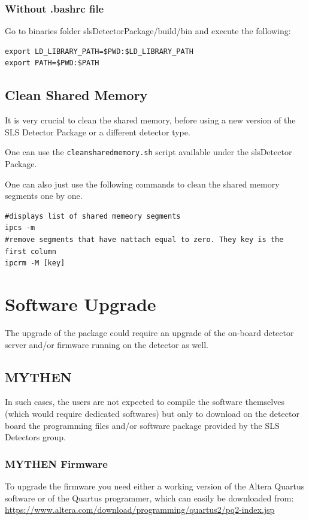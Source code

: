 \documentclass{article}
\begin{document}
\subsubsection{Without .bashrc file}
Go to binaries folder slsDetectorPackage/build/bin and execute the following:
\begin{verbatim}
export LD_LIBRARY_PATH=$PWD:$LD_LIBRARY_PATH
export PATH=$PWD:$PATH
\end{verbatim}


\subsection{Clean Shared Memory}
It is very crucial to clean the shared memory, before using a new version of
the SLS Detector Package or a different detector type.

One can use the \verb=cleansharedmemory.sh= script available under the
slsDetector Package.

One can also just use the following commands to clean the shared memory
segments one by one.
\begin{verbatim}
#displays list of shared memeory segments 
ipcs -m
#remove segments that have nattach equal to zero. They key is the first column
ipcrm -M [key]
\end{verbatim}

\section{Software Upgrade}

The upgrade of the package could require an upgrade of the on-board detector
server and/or firmware running on the detector as well.


\subsection{MYTHEN}
In such cases, the users are not expected to compile the software
themselves (which would require dedicated softwares) but only to download on the
detector board the programming files and/or software package provided by
the SLS Detectors group.

\subsubsection{MYTHEN Firmware}

To upgrade the firmware you need either a working version of the Altera
Quartus software or of the Quartus programmer, which can easily be downloaded
from: \\
\url{https://www.altera.com/download/programming/quartus2/pq2-index.jsp}
\medskip
\end{document}

